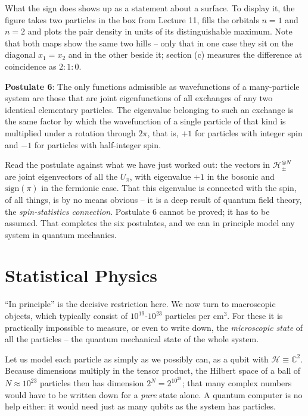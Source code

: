 What the sign does shows up as a statement about a surface. To display it, the figure takes two particles in the box from Lecture 11, fills the orbitals $n=1$ and $n=2$ and plots the pair density in units of its distinguishable maximum. Note that both maps show the same two hills -- only that in one case they sit on the diagonal $x_1=x_2$ and in the other beside it; section (c) measures the difference at coincidence as $2:1:0$.



\begin{center}
\parbox[c][5cm][c]{14cm}{\begin{tcolorbox}[colback=banana,arc=0cm,frame hidden,enhanced]{\textbf{Postulate 6}: The only functions admissible as wavefunctions of a many-particle system are those that are joint eigenfunctions of all exchanges of any two identical elementary particles. The eigenvalue belonging to such an exchange is
the same factor by which the wavefunction of a single particle of that kind is multiplied under a rotation through $2\pi$, that is, $+1$ for particles with integer spin and $-1$ for particles with half-integer spin.}\end{tcolorbox}}
\end{center}

Read the postulate against what we have just worked out: the vectors in $\mathcal{H}^{\otimes N}_{\pm}$ are joint eigenvectors of all the $U_\pi$, with eigenvalue $+1$ in the bosonic and $\text{sign}(\pi)$ in the fermionic case. That this eigenvalue is connected with the spin, of all things, is by no means obvious -- it is a deep result of quantum field theory, the \emph{spin-statistics connection}. Postulate 6 cannot be proved; it has to be assumed. That completes the six postulates, and we can in principle model any system in quantum mechanics.

\section*{Statistical Physics}
``In principle'' is the decisive restriction here. We now turn to macroscopic objects, which typically consist of $10^{19}$-$10^{23}$ particles per $\text{cm}^3$. For these it is practically impossible to measure, or even to write down, the \emph{microscopic state} of all the particles -- the quantum mechanical state of the whole system. 

\begin{greybox}
Let us model each particle as simply as we possibly can, as a qubit with $\mathcal{H}\equiv \mathbb{C}^2$. Because dimensions multiply in the tensor product, the Hilbert space of a ball of $N\approx 10^{23}$ particles then has dimension $2^N = 2^{10^{23}}$; that many complex numbers would have to be written down for a \emph{pure} state alone. A quantum computer is no help either: it would need just as many qubits as the system has particles.
\end{greybox}

